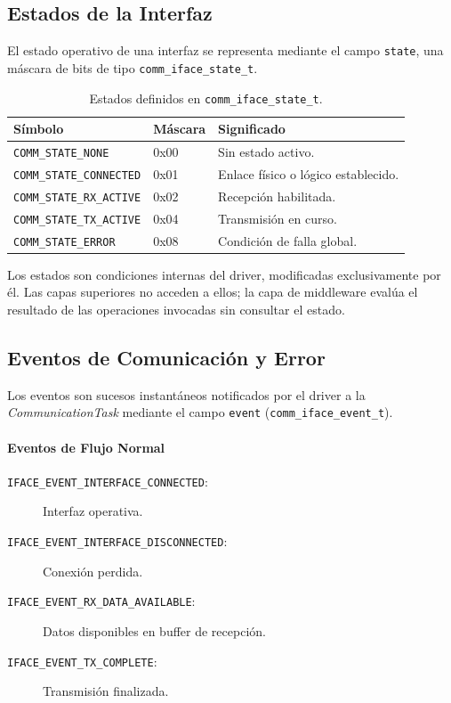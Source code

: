 \subsection{Estados de la Interfaz}
\label{subsec:estados-interfaz}

El estado operativo de una interfaz se representa mediante el campo \texttt{state}, una máscara de bits de tipo \texttt{comm\_iface\_state\_t}.

\begin{table}[htbp]
    \centering
    \caption{Estados definidos en \texttt{comm\_iface\_state\_t}.}
    \label{tab:comm-iface-state}
    \begin{tabular}{llp{6cm}}
        \toprule
        \textbf{Símbolo} & \textbf{Máscara} & \textbf{Significado} \\
        \midrule
        \texttt{COMM\_STATE\_NONE}      & 0x00 & Sin estado activo. \\
        \texttt{COMM\_STATE\_CONNECTED} & 0x01 & Enlace físico o lógico establecido. \\
        \texttt{COMM\_STATE\_RX\_ACTIVE}& 0x02 & Recepción habilitada. \\
        \texttt{COMM\_STATE\_TX\_ACTIVE}& 0x04 & Transmisión en curso. \\
        \texttt{COMM\_STATE\_ERROR}     & 0x08 & Condición de falla global. \\
        \bottomrule
    \end{tabular}
\end{table}

Los estados son condiciones internas del driver, modificadas exclusivamente por él. Las capas superiores no acceden a ellos; la capa de middleware evalúa el resultado de las operaciones invocadas sin consultar el estado.

\subsection{Eventos de Comunicación y Error}
\label{subsec:eventos-comunicacion}

Los eventos son sucesos instantáneos notificados por el driver a la \textit{CommunicationTask} mediante el campo \texttt{event} (\texttt{comm\_iface\_event\_t}).

\paragraph{Eventos de Flujo Normal}

\begin{description}
    \item[\texttt{IFACE\_EVENT\_INTERFACE\_CONNECTED}:] Interfaz operativa.
    \item[\texttt{IFACE\_EVENT\_INTERFACE\_DISCONNECTED}:] Conexión perdida.
    \item[\texttt{IFACE\_EVENT\_RX\_DATA\_AVAILABLE}:] Datos disponibles en buffer de recepción.
    \item[\texttt{IFACE\_EVENT\_TX\_COMPLETE}:] Transmisión finalizada.
\end{description}

